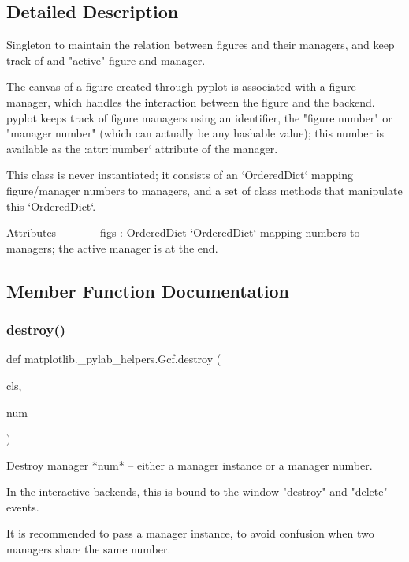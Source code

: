 \subsection{Detailed Description}
\begin{DoxyVerb}Singleton to maintain the relation between figures and their managers, and
keep track of and "active" figure and manager.

The canvas of a figure created through pyplot is associated with a figure
manager, which handles the interaction between the figure and the backend.
pyplot keeps track of figure managers using an identifier, the "figure
number" or "manager number" (which can actually be any hashable value);
this number is available as the :attr:`number` attribute of the manager.

This class is never instantiated; it consists of an `OrderedDict` mapping
figure/manager numbers to managers, and a set of class methods that
manipulate this `OrderedDict`.

Attributes
----------
figs : OrderedDict
    `OrderedDict` mapping numbers to managers; the active manager is at the
    end.
\end{DoxyVerb}
 

\subsection{Member Function Documentation}
\mbox{\label{classmatplotlib_1_1__pylab__helpers_1_1Gcf_a86f75e007ad25fdd27d8b9d653fbbc68}} 
\subsubsection{\texorpdfstring{destroy()}{destroy()}}
{\footnotesize\ttfamily def matplotlib.\+\_\+pylab\+\_\+helpers.\+Gcf.\+destroy (\begin{DoxyParamCaption}\item[{}]{cls,  }\item[{}]{num }\end{DoxyParamCaption})}

\begin{DoxyVerb}Destroy manager *num* -- either a manager instance or a manager number.

In the interactive backends, this is bound to the window "destroy" and
"delete" events.

It is recommended to pass a manager instance, to avoid confusion when
two managers share the same number.
\end{DoxyVerb}
 \mbox{\label{classmatplotlib_1_1__pylab__helpers_1_1Gcf_a905219f103cc91dfde091ed3646a6232}} 
